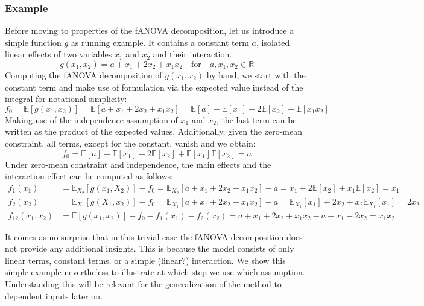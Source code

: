 \subsubsection*{Example}
Before moving to properties of the fANOVA decomposition, let us introduce a simple function $g$ as running example. It contains a constant term $a$, isolated linear effects of two variables $x_1$ and $x_2$ and their interaction.
\[
g(x_1, x_2) = a + x_1 + 2x_2 + x_1x_2 \quad \text{for} \quad a, x_1, x_2 \in \mathbb{R}
\]
Computing the fANOVA decomposition of $g(x_1, x_2)$ by hand, we start with the constant term and make use of formulation via the expected value instead of the integral for notational simplicity:
\[
f_0 = \mathbb{E}[g(x_1, x_2)] = \mathbb{E}[a + x_1 + 2x_2 + x_1x_2] = \mathbb{E}[a] + \mathbb{E}[x_1] + 2\mathbb{E}[x_2] + \mathbb{E}[x_1x_2]
\]
Making use of the independence assumption of $x_1$ and $x_2$, the last term can be written as the product of the expected values. Additionally, given the zero-mean constraint, all terms, except for the constant, vanish and we obtain:
\[
f_0 = \mathbb{E}[a] + \mathbb{E}[x_1] + 2\mathbb{E}[x_2] + \mathbb{E}[x_1]\mathbb{E}[x_2] = a
\]
Under zero-mean constraint and independence, the main effects and the interaction effect can be computed as follows:
\begin{align*}
f_1(x_1) &= \mathbb{E}_{X_2}[g(x_1, X_2)] - f_0 = \mathbb{E}_{X_2}[a + x_1 + 2x_2 + x_1x_2] - a = x_1 + 2\mathbb{E}[x_2] + x_1\mathbb{E}[x_2] = x_1\\
f_2(x_2) &= \mathbb{E}_{X_1}[g(X_1, x_2)] - f_0 = \mathbb{E}_{X_1}[a + x_1 + 2x_2 + x_1x_2] - a = \mathbb{E}_{X_1}[x_1] + 2x_2 + x_2\mathbb{E}_{X_1}[x_1] = 2x_2\\
f_{12}(x_1, x_2) &= \mathbb{E}[g(x_1, x_2)] - f_0 - f_1(x_1) - f_2(x_2) = a + x_1 + 2x_2 + x_1x_2 - a - x_1 - 2x_2 = x_1x_2
\end{align*}

It comes as no surprise that in this trivial case the fANOVA decomposition does not provide any additional insights. This is because the model consists of only linear terms, constant terms, or a simple (linear?) interaction. We show this simple example nevertheless to illustrate at which step we use which assumption. Understanding this will be relevant for the generalization of the method to dependent inputs later on.\par

